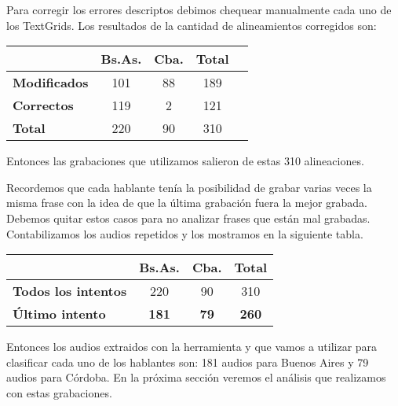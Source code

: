 Para corregir los errores descriptos debimos chequear manualmente cada uno de los TextGrids. Los resultados de la cantidad de alineamientos corregidos son:

\begin{table}[h]
\centering
\begin{tabular}{|l|c|c|c|c|}
\hline
\textbf{}  & \textbf{Bs.As. } & \textbf{Cba.} & \textbf{Total} \\ \hline
\textbf{Modificados}  & 101 & 88 & 189 \\ \hline
\textbf{Correctos}  & 119 & 2 & 121 \\ \hline
\textbf{Total} & 220 & 90 & 310 \\ \hline
\end{tabular}
\end{table}

Entonces las grabaciones que utilizamos salieron de estas 310 alineaciones. 

Recordemos que cada hablante tenía la posibilidad de grabar varias veces la misma frase con la idea de que la última grabación fuera la mejor grabada. Debemos quitar estos casos para no analizar frases que están mal grabadas. Contabilizamos los audios repetidos y los mostramos en la siguiente tabla.

\begin{table}[H]
\centering
\begin{tabular}{|l|c|c|c|}
\hline
\textbf{}  & \textbf{Bs.As. } & \textbf{Cba.} & \textbf{Total} \\ \hline
\textbf{Todos los intentos}  & 220 & 90 & 310 \\ \hline
\textbf{Último intento}  & \textbf{181} & \textbf{79} & \textbf{260} \\ \hline
\end{tabular}
\end{table}

Entonces los audios extraidos con la herramienta y que vamos a utilizar para clasificar cada uno de los hablantes son: 181 audios para Buenos Aires y 79 audios para Córdoba.
En la próxima sección veremos el análisis que realizamos con estas grabaciones. 
